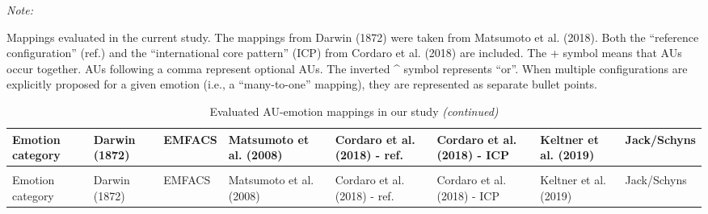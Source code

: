 \documentclass[12pt,american,a4paper,oneside,]{memoir} %
\begin{document}
\begin{ThreePartTable}
\begin{TableNotes}[para]
\item \textit{Note: } 
\item Mappings evaluated in the current study. The mappings from Darwin (1872) were taken from Matsumoto et al. (2018). Both the “reference configuration” (ref.) and the “international core pattern” (ICP) from Cordaro et al. (2018) are included. The + symbol means that AUs occur together. AUs following a comma represent optional AUs. The inverted \textasciicircum{} symbol represents “or”. When multiple configurations are explicitly proposed for a given emotion (i.e., a “many-to-one” mapping), they are represented as separate bullet points.
\end{TableNotes}
\begin{longtabu} to 
\caption{\label{tab:tab-hka-1}Evaluated AU-emotion mappings in our study}\\
\toprule
Emotion category & Darwin (1872) & EMFACS & Matsumoto et al. (2008) & Cordaro et al. (2018) - ref. & Cordaro et al. (2018) - ICP & Keltner et al. (2019) & Jack/Schyns\\
\midrule
\endfirsthead
\caption[]{\label{tab:tab-hka-1}Evaluated AU-emotion mappings in our study \textit{(continued)}}\\
\toprule
Emotion category & Darwin (1872) & EMFACS & Matsumoto et al. (2008) & Cordaro et al. (2018) - ref. & Cordaro et al. (2018) - ICP & Keltner et al. (2019) & Jack/Schyns\\
\midrule
\endhead


\end{longtabu}
\end{ThreePartTable}
\end{document}
